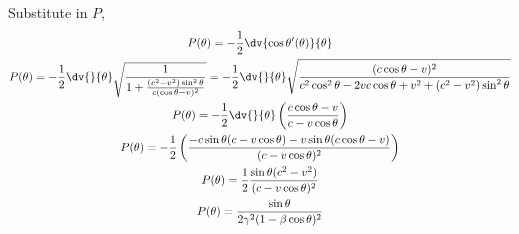 \documentclass[12pt]{article}
\begin{document}
        Substitute in $P$, 
        \begin{gather*}
            P(\theta) = -\frac{1}{2}\dv{\cos \theta'(\theta)}{\theta}\\
            P(\theta) = -\frac{1}{2}\dv{}{\theta}\sqrt{\frac{1}{1 + \frac{(c^2 - v^2)\sin^2 \theta}{c (\cos\theta - v)^2} }} =-\frac{1}{2}\dv{}{\theta}\sqrt{\frac{(c\cos\theta - v)^2}{c^2\cos^2 \theta- 2vc \cos \theta + v^2 + {(c^2 - v^2)\sin^2 \theta} }}\\
            P(\theta) = -\frac{1}{2}\dv{}{\theta}\left({\frac{c\cos\theta - v}{c - v \cos\theta} }\right)\\
            P(\theta) = -\frac{1}{2}\left(\frac{ -c\sin\theta(c - v \cos\theta) - v\sin \theta(c \cos \theta - v)}{(c - v \cos\theta)^2} \right) \\
            P(\theta)= \frac{1}{2}\frac{\sin \theta(c^2 - v^2)}{(c - v \cos\theta)^2}\\
            P(\theta)= \frac{\sin \theta}{2\gamma^2(1 - \beta \cos\theta)^2}
        \end{gather*}
        \subsection{}
\end{document}
